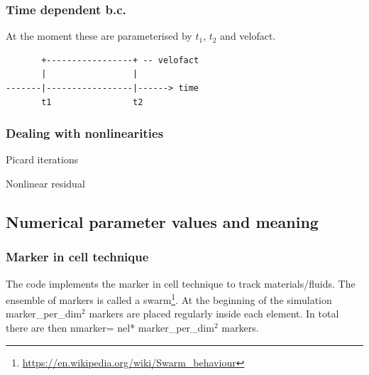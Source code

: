 \documentclass[a4paper]{article}
\newcommand{\python}{\color{darkgray} \sffamily }
\begin{document}
\subsubsection{Time dependent b.c.}

At the moment these are parameterised by $t_1$, $t_2$ and velofact.

\begin{verbatim}
       +-----------------+ -- velofact
       |                 |
-------|-----------------|------> time
       t1                t2
\end{verbatim}



\subsubsection{Dealing with nonlinearities}

Picard iterations

Nonlinear residual


\subsection{Numerical parameter values and meaning}


\subsubsection{Marker in cell technique}

The code implements the marker in cell technique to track 
materials/fluids. The ensemble of markers is called a 
swarm\footnote{\url{https://en.wikipedia.org/wiki/Swarm_behaviour}}.
At the beginning of the simulation {\python marker\_per\_dim}$^2$
markers are placed regularly inside each element.
In total there are then {\python nmarker}={\python nel}*{\python marker\_per\_dim}$^2$
markers.
 
\end{document}
